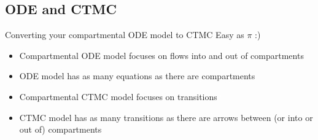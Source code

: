 \documentclass[aspectratio=169]{beamer}\usepackage[]{graphicx}\usepackage[]{xcolor}
\begin{document}
%     
%     
%     



\subsection{ODE and CTMC}


\begin{frame}{Converting your compartmental ODE model to CTMC}
    Easy as $\pi$ :)
\vfill
\begin{itemize}
    \item Compartmental ODE model focuses on flows into and out of compartments
    \vfill
    \item ODE model has as many equations as there are compartments
    \vfill
    \item Compartmental CTMC model focuses on transitions
    \vfill
    \item CTMC model has as many transitions as there are arrows between (or into or out of) compartments
\end{itemize}
\end{frame}
\end{document}
